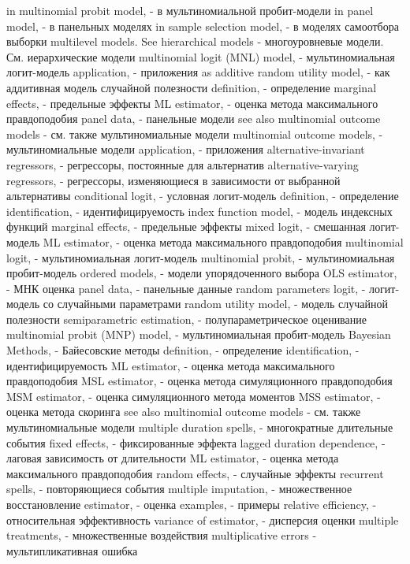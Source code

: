 in multinomial probit model, - в мультиномиальной пробит-модели
in panel model, - в панельных моделях
in sample selection model, - в моделях самоотбора выборки
multilevel models. See hierarchical models - многоуровневые модели. См. иерархические модели
multinomial logit (MNL) model, - мультиномиальная логит-модель
application, - приложения
as additive random utility model, - как аддитивная модель случайной полезности
definition, - определение
marginal effects, - предельные эффекты
ML estimator, - оценка метода максимального правдоподобия
panel data, - панельные модели
see also multinomial outcome models - см. также мультиномиальные модели
multinomial outcome models, - мультиномиальные модели
application, - приложения
alternative-invariant regressors, - регрессоры, постоянные для альтернатив 
alternative-varying regressors, - регрессоры, изменяющиеся в зависимости от выбранной альтернативы
conditional logit, - условная логит-модель
definition, - определение
identification, - идентифицируемость
index function model, - модель индексных функций
marginal effects, - предельные эффекты
mixed logit, - смешанная логит-модель
ML estimator, - оценка метода максимального правдоподобия
multinomial logit, - мультиномиальная логит-модель
multinomial probit, - мультиномиальная пробит-модель
ordered models, - модели упорядоченного выбора
OLS estimator, - МНК оценка
panel data, - панельные данные
random parameters logit, - логит-модель со случайными параметрами
random utility model, - модель случайной полезности
semiparametric estimation, - полупараметрическое оценивание
multinomial probit (MNP) model, - мультиномиальная пробит-модель
Bayesian Methods, - Байесовские методы
definition, - определение
identification, - идентифицируемость
ML estimator, - оценка метода максимального правдоподобия
MSL estimator, - оценка метода симуляционного правдоподобия
MSM estimator, - оценка симуляционного метода моментов
MSS estimator, - оценка метода скоринга
see also multinomial outcome models - см. также мультиномиальные модели
multiple duration spells, - многократные длительные события
fixed effects, - фиксированные эффекта
lagged duration dependence, - лаговая зависимость от длительности
ML estimator, - оценка метода максимального правдоподобия
random effects, - случайные эффекты
recurrent spells, - повторяющиеся события
multiple imputation, - множественное восстановление
estimator, - оценка
examples, - примеры
relative efficiency, - относительная эффективность
variance of estimator, - дисперсия оценки
multiple treatments, - множественные воздействия
multiplicative errors - мультипликативная ошибка
